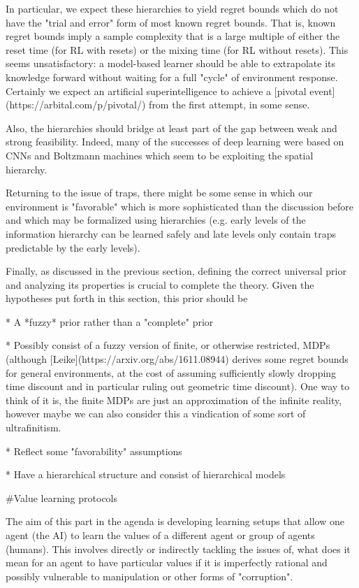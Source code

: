 \documentclass[a4paper]{article}
\begin{document}
In particular, we expect these hierarchies to yield regret bounds which do not have the "trial and error" form of most known regret bounds. That is, known regret bounds imply a sample complexity that is a large multiple of either the reset time (for RL with resets) or the mixing time (for RL without resets). This seems unsatisfactory: a model-based learner should be able to extrapolate its knowledge forward without waiting for a full "cycle" of environment response. Certainly we expect an artificial superintelligence to achieve a [pivotal event](https://arbital.com/p/pivotal/) from the first attempt, in some sense.

Also, the hierarchies should bridge at least part of the gap between weak and strong feasibility. Indeed, many of the successes of deep learning were based on CNNs and Boltzmann machines which seem to be exploiting the spatial hierarchy.

Returning to the issue of traps, there might be some sense in which our environment is "favorable" which is more sophisticated than the discussion before and which may be formalized using hierarchies (e.g. early levels of the information hierarchy can be learned safely and late levels only contain traps predictable by the early levels).

Finally, as discussed in the previous section, defining the correct universal prior and analyzing its properties is crucial to complete the theory. Given the hypotheses put forth in this section, this prior should be

* A *fuzzy* prior rather than a "complete" prior

* Possibly consist of a fuzzy version of finite, or otherwise restricted, MDPs (although [Leike](https://arxiv.org/abs/1611.08944) derives some regret bounds for general environments, at the cost of assuming sufficiently slowly dropping time discount and in particular ruling out geometric time discount). One way to think of it is, the finite MDPs are just an approximation of the infinite reality, however maybe we can also consider this a vindication of some sort of ultrafinitism.

* Reflect some "favorability" assumptions

* Have a hierarchical structure and consist of hierarchical models

\#Value learning protocols

The aim of this part in the agenda is developing learning setups that allow one agent (the AI) to learn the values of a different agent or group of agents (humans). This involves directly or indirectly tackling the issues of, what does it mean for an agent to have particular values if it is imperfectly rational and possibly vulnerable to manipulation or other forms of "corruption".
\end{document}

